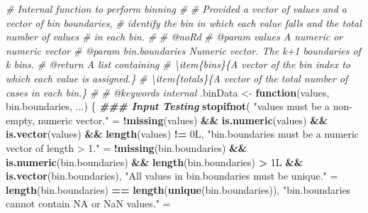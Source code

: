 \documentclass[
]{book}
\newenvironment{Shaded}{\begin{snugshade}}{\end{snugshade}}
\newcommand{\CommentTok}[1]{\textcolor[rgb]{0.56,0.35,0.01}{\textit{#1}}}
\newcommand{\ControlFlowTok}[1]{\textcolor[rgb]{0.13,0.29,0.53}{\textbf{#1}}}
\newcommand{\DocumentationTok}[1]{\textcolor[rgb]{0.56,0.35,0.01}{\textbf{\textit{#1}}}}
\newcommand{\FunctionTok}[1]{\textcolor[rgb]{0.13,0.29,0.53}{\textbf{#1}}}
\newcommand{\NormalTok}[1]{#1}
\newcommand{\OtherTok}[1]{\textcolor[rgb]{0.56,0.35,0.01}{#1}}
\newcommand{\SpecialCharTok}[1]{\textcolor[rgb]{0.81,0.36,0.00}{\textbf{#1}}}
\newcommand{\StringTok}[1]{\textcolor[rgb]{0.31,0.60,0.02}{#1}}
\begin{document}
\begin{Shaded}
\begin{Highlighting}[]
\CommentTok{\#\textquotesingle{} Internal function to perform binning}
\CommentTok{\#\textquotesingle{} }
\CommentTok{\#\textquotesingle{} Provided a vector of values and a vector of bin boundaries, }
\CommentTok{\#\textquotesingle{}   identify the bin in which each value falls and the total number of values}
\CommentTok{\#\textquotesingle{}   in each bin.}
\CommentTok{\#\textquotesingle{}}
\CommentTok{\#\textquotesingle{} @noRd}
\CommentTok{\#\textquotesingle{} @param values A numeric or numeric vector}
\CommentTok{\#\textquotesingle{} @param bin.boundaries Numeric vector. The k+1 boundaries of k bins.}
\CommentTok{\#\textquotesingle{} @return A list containing}
\CommentTok{\#\textquotesingle{} \textbackslash{}item\{bins\}\{A vector of the bin index to which each value is assigned.\}}
\CommentTok{\#\textquotesingle{} \textbackslash{}item\{totals\}\{A vector of the total number of cases in each bin.\}}
\CommentTok{\#\textquotesingle{} }
\CommentTok{\#\textquotesingle{} @keywords internal}
\NormalTok{.binData }\OtherTok{\textless{}{-}} \ControlFlowTok{function}\NormalTok{(values, bin.boundaries, ...) \{}
  \DocumentationTok{\#\#\# Input Testing}
  \FunctionTok{stopifnot}\NormalTok{(}
    \StringTok{"\textasciigrave{}values\textasciigrave{} must be a non{-}empty, numeric vector."} \OtherTok{=} 
      \SpecialCharTok{!}\FunctionTok{missing}\NormalTok{(values) }\SpecialCharTok{\&\&} \FunctionTok{is.numeric}\NormalTok{(values) }\SpecialCharTok{\&\&} \FunctionTok{is.vector}\NormalTok{(values) }\SpecialCharTok{\&\&}
      \FunctionTok{length}\NormalTok{(values) }\SpecialCharTok{!=}\NormalTok{ 0L,}
    \StringTok{"\textasciigrave{}bin.boundaries\textasciigrave{} must be a numeric vector of length \textgreater{} 1."} \OtherTok{=} 
      \SpecialCharTok{!}\FunctionTok{missing}\NormalTok{(bin.boundaries) }\SpecialCharTok{\&\&} \FunctionTok{is.numeric}\NormalTok{(bin.boundaries) }\SpecialCharTok{\&\&} 
      \FunctionTok{length}\NormalTok{(bin.boundaries) }\SpecialCharTok{\textgreater{}}\NormalTok{ 1L }\SpecialCharTok{\&\&} \FunctionTok{is.vector}\NormalTok{(bin.boundaries),}
    \StringTok{"All values in \textasciigrave{}bin.boundaries\textasciigrave{} must be unique."} \OtherTok{=} 
      \FunctionTok{length}\NormalTok{(bin.boundaries) }\SpecialCharTok{==} \FunctionTok{length}\NormalTok{(}\FunctionTok{unique}\NormalTok{(bin.boundaries)),}
    \StringTok{"\textasciigrave{}bin.boundaries\textasciigrave{} cannot contain NA or NaN values."} \OtherTok{=} 

\end{Highlighting}
\end{Shaded}
\end{document}
